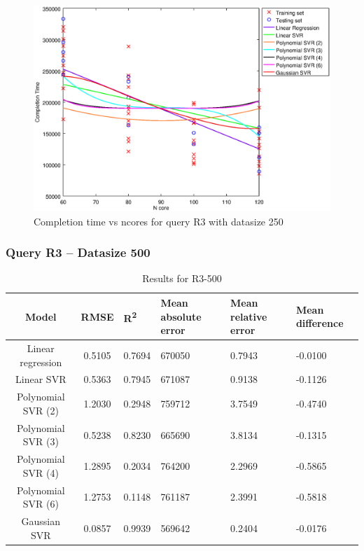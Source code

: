 \documentclass[a4paper,11pt]{article}
\begin{document}
\begin {figure}[hbtp]
\centering
\includegraphics[width=\textwidth]{output/R3_250_ONLY_1_LINEAR_NCORE/plot_R3_250.eps}
\caption{Completion time vs ncores for query R3 with datasize 250}
\label{fig:coreonly_linear_R3_250}
\end {figure}

\newpage
\subsubsection{Query R3 -- Datasize 500}
\begin{table}[H]
	\centering
	\begin{adjustbox}{center}
		\begin{tabular}{c | c M{1.2cm} M{2.5cm} M{2.5cm} M{1.8cm}}
			Model & RMSE & R\textsuperscript{2} & Mean absolute error & Mean relative error & Mean difference \tabularnewline
			\hline
			Linear regression & 0.5105 & 0.7694 & 670050 & 0.7943 & -0.0100 \\
			Linear SVR & 0.5363 & 0.7945 & 671087 & 0.9138 & -0.1126 \\
			Polynomial SVR (2) & 1.2030 & 0.2948 & 759712 & 3.7549 & -0.4740 \\
			Polynomial SVR (3) & 0.5238 & 0.8230 & 665690 & 3.8134 & -0.1315 \\
			Polynomial SVR (4) & 1.2895 & 0.2034 & 764200 & 2.2969 & -0.5865 \\
			Polynomial SVR (6) & 1.2753 & 0.1148 & 761187 & 2.3991 & -0.5818 \\
			Gaussian SVR & 0.0857 & 0.9939 & 569642 & 0.2404 & -0.0176 \\
		\end{tabular}
	\end{adjustbox}
	\\
	\caption{Results for R3-500}
	\label{fig:coreonly_linear_R3_500}
\end{table}
\end{document}
